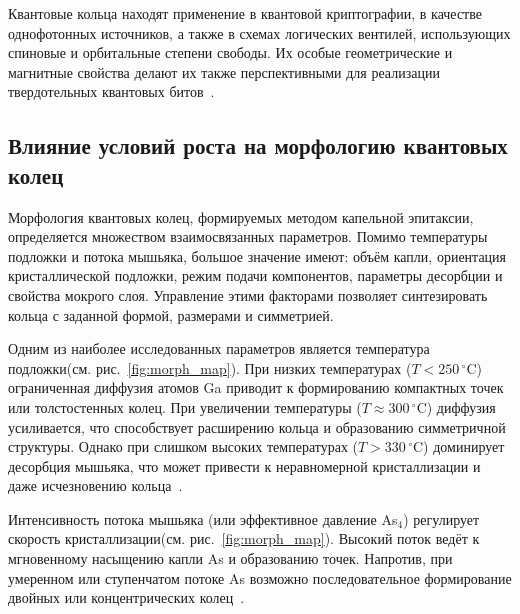 \documentclass[14pt,oneside]{extarticle}
\begin{document}
Квантовые кольца находят применение в квантовой криптографии, в качестве однофотонных источников, а также в схемах логических вентилей, использующих спиновые и орбитальные степени свободы. Их особые геометрические и магнитные свойства делают их также перспективными для реализации твердотельных квантовых битов~\cite{Liu2019}.

\subsection{Влияние условий роста на морфологию квантовых колец}

Морфология квантовых колец, формируемых методом капельной эпитаксии, определяется множеством взаимосвязанных параметров. Помимо температуры подложки и потока мышьяка, большое значение имеют: объём капли, ориентация кристаллической подложки, режим подачи компонентов, параметры десорбции и свойства мокрого слоя. Управление этими факторами позволяет синтезировать кольца с заданной формой, размерами и симметрией.

Одним из наиболее исследованных параметров является температура подложки(см. рис.~\ref{fig:morph_map}). При низких температурах ($T < 250\,^{\circ}\mathrm{C}$) ограниченная диффузия атомов Ga приводит к формированию компактных точек или толстостенных колец. При увеличении температуры ($T \approx 300\,^{\circ}\mathrm{C}$) диффузия усиливается, что способствует расширению кольца и образованию симметричной структуры. Однако при слишком высоких температурах ($T > 330\,^{\circ}\mathrm{C}$) доминирует десорбция мышьяка, что может привести к неравномерной кристаллизации и даже исчезновению кольца~\cite{sibirmovskiy2014,vasilevskiy2013}.

Интенсивность потока мышьяка (или эффективное давление As$_4$) регулирует скорость кристаллизации(см. рис.~\ref{fig:morph_map}). Высокий поток ведёт к мгновенному насыщению капли As и образованию точек. Напротив, при умеренном или ступенчатом потоке As возможно последовательное формирование двойных или концентрических колец~\cite{zhou2013,fan2023}.
\end{document}
